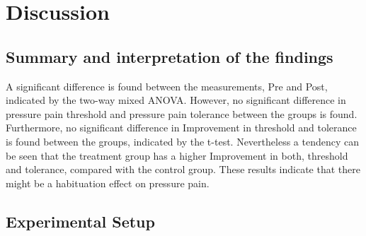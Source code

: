 \section{Discussion}

\subsection{Summary and interpretation of the findings}

A significant difference is found between the measurements, Pre and Post, indicated by the two-way mixed ANOVA. However, no significant difference in pressure pain threshold and pressure pain tolerance between the groups is found. Furthermore, no significant difference in Improvement in threshold and tolerance is found between the groups, indicated by the t-test. Nevertheless a tendency can be seen that the treatment group has a higher Improvement in both, threshold and tolerance, compared with the control group. These results indicate that there might be a habituation effect on pressure pain. 

\subsection{Experimental Setup}

